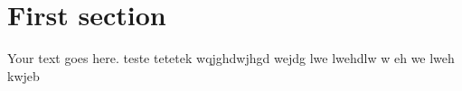
\author{The Author}
\section{First section}
Your text goes here. teste tetetek   wqjghdwjhgd 	wejdg lwe   lwehdlw	  w	eh	we 	lweh kwjeb 
